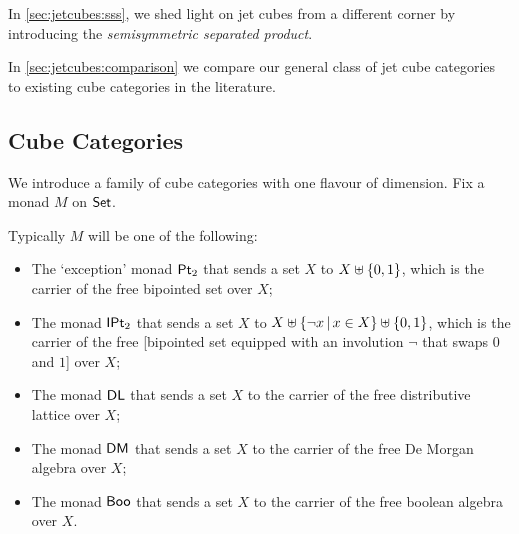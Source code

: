 \documentclass[a4paper]{memoir}
\begin{document}
In \cref{sec:jetcubes:sss}, we shed light on jet cubes from a different corner by introducing the \emph{semisymmetric separated product}.

In \cref{sec:jetcubes:comparison} we compare our general class of jet cube categories to existing cube categories in the literature.

\subsection{Cube Categories} \label{sec:cubes}
We introduce a family of cube categories with one flavour of dimension. Fix a monad $M$ on ${\mathsf{Set}}$.
\begin{example} \label{ex:cube-monads}
	Typically $M$ will be one of the following:
	\begin{itemize}
		\item The `exception' monad ${\mathsf{Pt}_2}$ that sends a set $X$ to $X \uplus \mathopen{}\left\{ 0,1 \right\}\mathclose{}$, which is the carrier of the free bipointed set over $X$;
		\item The monad ${\mathsf{IPt}_2}$ that sends a set $X$ to $X \uplus \mathopen{}\left\{ \lnot x \,\middle|\, x \in X \right\}\mathclose{} \uplus \mathopen{}\left\{ 0, 1 \right\}\mathclose{}$, which is the carrier of the free [bipointed set equipped with an involution $\lnot$ that swaps $0$ and $1$] over $X$;
		\item The monad $\mathsf{DL}$ that sends a set $X$ to the carrier of the free distributive lattice over $X$;
		\item The monad $\mathsf{DM}$ that sends a set $X$ to the carrier of the free De Morgan algebra over $X$;
		\item The monad $\mathsf{Boo}$ that sends a set $X$ to the carrier of the free boolean algebra over $X$.
	\end{itemize}
\end{example}
\end{document}
